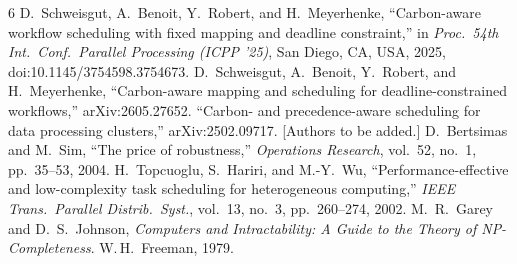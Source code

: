 \documentclass[conference,11pt]{IEEEtran}
\theoremstyle{definition}\newtheorem{remark}{Remark}
\begin{document}
\begin{thebibliography}{6}
 D.~Schweisgut, A.~Benoit, Y.~Robert, and H.~Meyerhenke, ``Carbon-aware workflow scheduling with fixed mapping and deadline constraint,'' in \emph{Proc.\ 54th Int.\ Conf.\ Parallel Processing (ICPP '25)}, San Diego, CA, USA, 2025, doi:10.1145/3754598.3754673.
 D.~Schweisgut, A.~Benoit, Y.~Robert, and H.~Meyerhenke, ``Carbon-aware mapping and scheduling for deadline-constrained workflows,'' arXiv:2605.27652.
 ``Carbon- and precedence-aware scheduling for data processing clusters,'' arXiv:2502.09717. [Authors to be added.]
 D.~Bertsimas and M.~Sim, ``The price of robustness,'' \emph{Operations Research}, vol.~52, no.~1, pp.~35--53, 2004.
 H.~Topcuoglu, S.~Hariri, and M.-Y.~Wu, ``Performance-effective and low-complexity task scheduling for heterogeneous computing,'' \emph{IEEE Trans.\ Parallel Distrib.\ Syst.}, vol.~13, no.~3, pp.~260--274, 2002.
 M.~R.~Garey and D.~S.~Johnson, \emph{Computers and Intractability: A Guide to the Theory of NP-Completeness}. W.\,H.\ Freeman, 1979.
\end{thebibliography}
\end{document}
